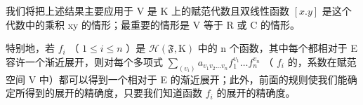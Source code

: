 我们将把上述结果主要应用于 V 是 K 上的赋范代数且双线性函数 \([x.y]\) 是这个代数中的乘积 xy 的情形；最重要的情形是 V 等于 R 或 C 的情形。

特别地，若 \(f_{i}\) （ \(1 \leqslant i \leqslant n\) ）是 \(\mathcal{H}(\mathfrak{F}, \mathrm{K})\) 中的 n 个函数，其中每个都相对于 E 容许一个渐近展开，则对每个多项式 \(\sum_{(v_{i})} a_{v_{1}v_{2}\ldots v_{n}} f_{1}^{v_{1}} \ldots f_{n}^{v_{n}}\) （ \(f_{i}\) 的，系数在赋范空间 V 中）都可以得到一个相对于 E 的渐近展开；此外，前面的规则使我们能确定所得到的展开的精确度，只要我们知道函数 \(f_{i}\) 的展开的精确度。


